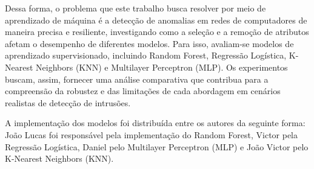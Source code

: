 Dessa forma, o problema que este trabalho busca resolver por meio de aprendizado de máquina é a detecção de anomalias em redes de computadores de maneira precisa e resiliente, investigando como a seleção e a remoção de atributos afetam o desempenho de diferentes modelos. Para isso, avaliam-se modelos de aprendizado supervisionado, incluindo Random Forest, Regressão Logística, K-Nearest Neighbors (KNN) e Multilayer Perceptron (MLP). Os experimentos buscam, assim, fornecer uma análise comparativa que contribua para a compreensão da robustez e das limitações de cada abordagem em cenários realistas de detecção de intrusões.

A implementação dos modelos foi distribuída entre os autores da seguinte forma: João Lucas foi responsável pela implementação do Random Forest, Victor pela Regressão Logística, Daniel pelo Multilayer Perceptron (MLP) e João Victor pelo K-Nearest Neighbors (KNN).